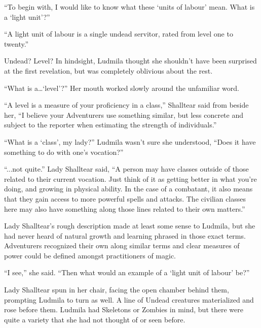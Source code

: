  

“To begin with, I would like to know what these ‘units of labour’ mean. What is a ‘light unit’?”

 

“A light unit of labour is a single undead servitor, rated from level one to twenty.”

 

Undead? Level? In hindsight, Ludmila thought she shouldn’t have been surprised at the first revelation, but was completely oblivious about the rest.

 

“What is a…‘level’?” Her mouth worked slowly around the unfamiliar word.

 

“A level is a measure of your proficiency in a class,” Shalltear said from beside her, “I believe your Adventurers use something similar, but less concrete and subject to the reporter when estimating the strength of individuals.”

 

“What is a ‘class’, my lady?” Ludmila wasn’t sure she understood, “Does it have something to do with one’s vocation?”

 

“...not quite.” Lady Shalltear said, “A person may have classes outside of those related to their current vocation. Just think of it as getting better in what you’re doing, and growing in physical ability. In the case of a combatant, it also means that they gain access to more powerful spells and attacks. The civilian classes here may also have something along those lines related to their own matters.”

 

Lady Shalltear’s rough description made at least some sense to Ludmila, but she had never heard of natural growth and learning phrased in those exact terms. Adventurers recognized their own along similar terms and clear measures of power could be defined amongst practitioners of magic.

 

“I see,” she said. “Then what would an example of a ‘light unit of labour’ be?”

 

Lady Shalltear spun in her chair, facing the open chamber behind them, prompting Ludmila to turn as well. A line of Undead creatures materialized and rose before them. Ludmila had Skeletons or Zombies in mind, but there were quite a variety that she had not thought of or seen before.

